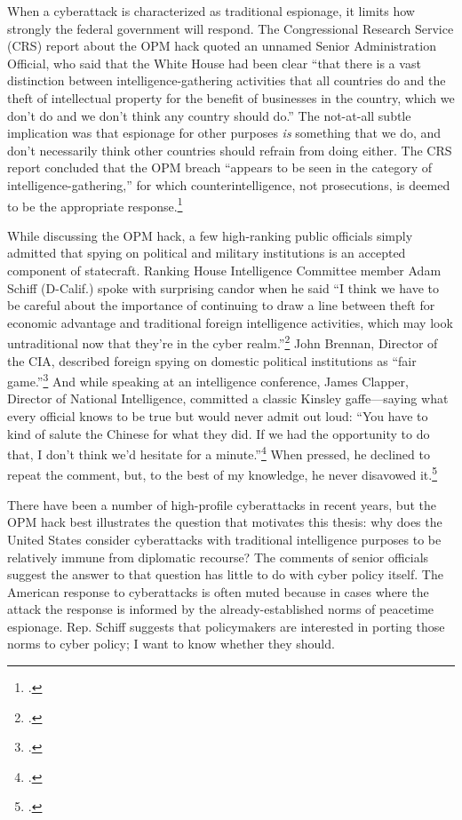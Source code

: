 \documentclass{memoir}
\begin{document}
\begin{refsegment}
When a cyberattack is characterized as traditional espionage, it limits how strongly the federal government will respond. The Congressional Research Service (CRS) report about the OPM hack quoted an unnamed Senior Administration Official, who said that the White House had been clear ``that there is a vast distinction between intelligence-gathering activities that all countries do and the theft of intellectual property for the benefit of businesses in the country, which we don't do and we don't think any country should do.'' The not-at-all subtle implication was that espionage for other purposes \emph{is} something that we do, and don't necessarily think other countries should refrain from doing either. The CRS report concluded that the OPM breach ``appears to be seen in the category of intelligence-gathering,'' for which counterintelligence, not prosecutions, is deemed to be the appropriate response.\footcite{finklea_cyber_2015}

While discussing the OPM hack, a few high-ranking public officials simply admitted that spying on political and military institutions is an accepted component of statecraft. Ranking House Intelligence Committee member Adam Schiff (D-Calif.) spoke with surprising candor when he said ``I think we have to be careful about the importance of continuing to draw a line between theft for economic advantage and traditional foreign intelligence activities, which may look untraditional now that they’re in the cyber realm.''\footcite{nakashima_hacks_2015} John Brennan, Director of the CIA, described foreign spying on domestic political institutions as ``fair game.''\footcite{sanger_u.s._2016} And while speaking at an intelligence conference, James Clapper, Director of National Intelligence, committed a classic Kinsley gaffe---saying what every official knows to be true but would never admit out loud: ``You have to kind of salute the Chinese for what they did. If we had the opportunity to do that, I don't think we'd hesitate for a minute.''\footcite{pepitone_clapper_2015} When pressed, he declined to repeat the comment, but, to the best of my knowledge, he never disavowed it.\footcite{sanger_u.s._2015}

There have been a number of high-profile cyberattacks in recent years, but the OPM hack best illustrates the question that motivates this thesis: why does the United States consider cyberattacks with traditional intelligence purposes to be relatively immune from diplomatic recourse? The comments of senior officials suggest the answer to that question has little to do with cyber policy itself. The American response to cyberattacks is often muted because in cases where the attack the response is informed by the already-established norms of peacetime espionage. Rep. Schiff suggests that policymakers are interested in porting those norms to cyber policy; I want to know whether they should.


\end{refsegment}
\end{document}
